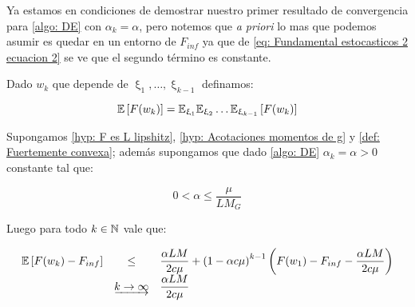 Ya estamos en condiciones de demostrar nuestro primer resultado de convergencia para \ref{algo: DE} con $\alpha_k = \alpha$, pero notemos que \textit{a priori} lo mas que podemos asumir es quedar en un entorno de $F_{inf}$ ya que de \ref{eq: Fundamental estocasticos 2 ecuacion 2} se ve que el segundo t\'ermino es constante.

Dado $w_k$ que depende de $\upxi_{1}, \dots, \upxi_{k-1}$ definamos:

\begin{equation*}
	\label{def: esperanza total}
	\mathbb{E} \left[F(w_k)\right] = \mathbb{E}_{\upxi_{1}}\mathbb{E}_{\upxi_{2}}\dots \mathbb{E}_{\upxi_{k-1}}\left[F(w_k)\right]
\end{equation*}

\begin{theorem}
	\label{theorem: DE en fuertemente convexo y alfa fijo converge en l1}
	Supongamos \ref{hyp: F es L lipshitz}, \ref{hyp: Acotaciones momentos de g} y \ref{def: Fuertemente convexa}; adem\'as supongamos que dado \ref{algo: DE} $\alpha_k = \alpha >0 $ constante tal que:
	
	\begin{equation}
	\label{eq: Condicion alfa Conv L1 fuertemente convexo}
	0  < \alpha \leq \dfrac{\mu}{LM_G} 
	\end{equation}
	
	Luego para todo $k \in {\mathbb{N}}$ vale que:
	
	\begin{equation*}
	\begin{array}{rcl}
	\mathbb{E} \left[F(w_k) - F_{inf}\right] & \leq & \dfrac{\alpha LM}{2 c \mu} + \left(1 - \alpha c \mu \right)^{k-1} \left(F(w_1) - F_{inf} - \dfrac{\alpha LM}{2 c \mu} \right) \\
	& \underrightarrow{k \rightarrow \infty} & \dfrac{\alpha LM}{2 c \mu} 
	\end{array}
	\end{equation*}
	 
\end{theorem}

